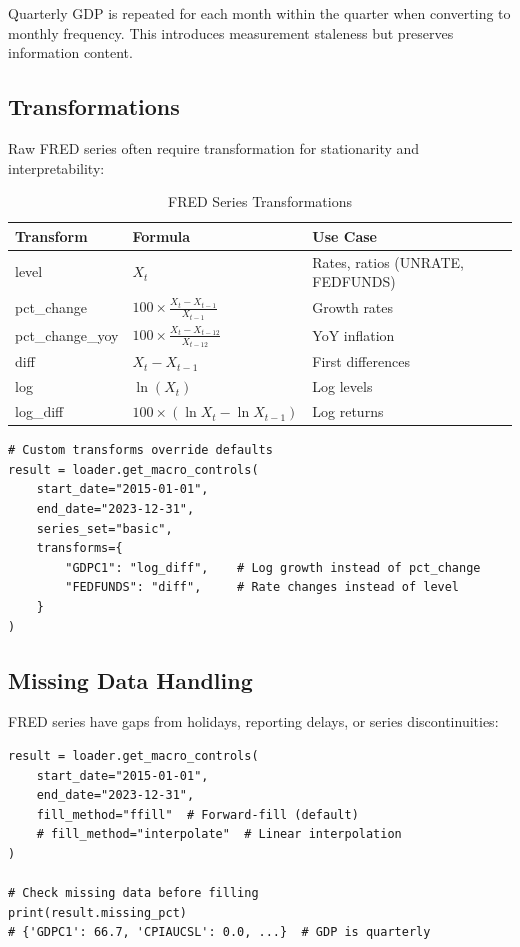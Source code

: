\begin{remark}
Quarterly GDP is repeated for each month within the quarter when converting to monthly frequency. This introduces measurement staleness but preserves information content.
\end{remark}

\subsection{Transformations}

Raw FRED series often require transformation for stationarity and interpretability:

\begin{table}[htbp]
\centering
\caption{FRED Series Transformations}
\label{tab:transforms}
\begin{tabular}{lll}
\hline
\textbf{Transform} & \textbf{Formula} & \textbf{Use Case} \\
\hline
level & $X_t$ & Rates, ratios (UNRATE, FEDFUNDS) \\
pct\_change & $100 \times \frac{X_t - X_{t-1}}{X_{t-1}}$ & Growth rates \\
pct\_change\_yoy & $100 \times \frac{X_t - X_{t-12}}{X_{t-12}}$ & YoY inflation \\
diff & $X_t - X_{t-1}$ & First differences \\
log & $\ln(X_t)$ & Log levels \\
log\_diff & $100 \times (\ln X_t - \ln X_{t-1})$ & Log returns \\
\hline
\end{tabular}
\end{table}

\begin{verbatim}
# Custom transforms override defaults
result = loader.get_macro_controls(
    start_date="2015-01-01",
    end_date="2023-12-31",
    series_set="basic",
    transforms={
        "GDPC1": "log_diff",    # Log growth instead of pct_change
        "FEDFUNDS": "diff",     # Rate changes instead of level
    }
)
\end{verbatim}

\subsection{Missing Data Handling}

FRED series have gaps from holidays, reporting delays, or series discontinuities:

\begin{verbatim}
result = loader.get_macro_controls(
    start_date="2015-01-01",
    end_date="2023-12-31",
    fill_method="ffill"  # Forward-fill (default)
    # fill_method="interpolate"  # Linear interpolation
)

# Check missing data before filling
print(result.missing_pct)
# {'GDPC1': 66.7, 'CPIAUCSL': 0.0, ...}  # GDP is quarterly
\end{verbatim}

